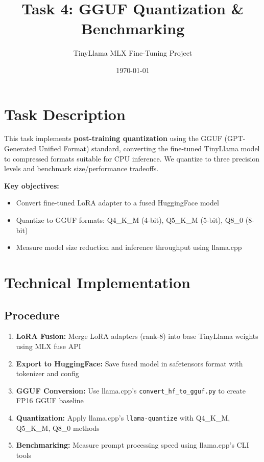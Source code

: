 \documentclass[11pt,a4paper]{article}
\title{\textbf{Task 4: GGUF Quantization \& Benchmarking}}
\author{TinyLlama MLX Fine-Tuning Project}
\date{\today}
\begin{document}
\maketitle

\section*{Task Description}
This task implements \textbf{post-training quantization} using the GGUF (GPT-Generated Unified Format) standard, converting the fine-tuned TinyLlama model to compressed formats suitable for CPU inference. We quantize to three precision levels and benchmark size/performance tradeoffs.

\textbf{Key objectives:}
\begin{itemize}
    \item Convert fine-tuned LoRA adapter to a fused HuggingFace model
    \item Quantize to GGUF formats: Q4\_K\_M (4-bit), Q5\_K\_M (5-bit), Q8\_0 (8-bit)
    \item Measure model size reduction and inference throughput using llama.cpp
\end{itemize}

\section*{Technical Implementation}

\subsection*{Procedure}
\begin{enumerate}
    \item \textbf{LoRA Fusion:} Merge LoRA adapters (rank-8) into base TinyLlama weights using MLX fuse API
    \item \textbf{Export to HuggingFace:} Save fused model in safetensors format with tokenizer and config
    \item \textbf{GGUF Conversion:} Use llama.cpp's \texttt{convert\_hf\_to\_gguf.py} to create FP16 GGUF baseline
    \item \textbf{Quantization:} Apply llama.cpp's \texttt{llama-quantize} with Q4\_K\_M, Q5\_K\_M, Q8\_0 methods
    \item \textbf{Benchmarking:} Measure prompt processing speed using llama.cpp's CLI tools
\end{enumerate}
\end{document}
